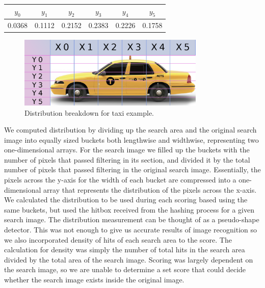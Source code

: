 \documentclass[10pt, journal]{vgtc}                %
\begin{document}
\begin{flushleft}
\begin{table}[h!]
\begin{center}
	\end{center}
	\begin{center}
		\begin{tabular}{cccccc}
			$y_0$ & $y_1$ & $y_2$ & $y_3$ & $y_4$  & $y_5$\\
			\hline
			0.0368 &  0.1112 & 0.2152 & 0.2383 & 0.2226 & 0.1758 \\
		\end{tabular}
\end{center}
\end{table}
\begin{figure}[h!]
\centering
\includegraphics[width=3.5in]{distribution.png}
\caption{Distribution breakdown for taxi example.}
\end{figure}
We computed distribution by dividing up the search area and the original search image into equally sized buckets both lengthwise and widthwise, representing two one-dimensional arrays. For the search image we filled up the buckets with the number of pixels that passed filtering in its section, and divided it by the total number of pixels that passed filtering in the original search image. Essentially, the pixels across the y-axis for the width of each bucket are compressed into a one-dimensional array that represents the distribution of the pixels across the x-axis. We calculated the distribution to be used during each scoring based using the same buckets, but used the hitbox received from the hashing process for a given search image. The distribution measurement can be thought of as a pseudo-shape detector. This was not enough to give us accurate results of image recognition so we also incorporated density of hits of each search area to the score. The calculation for density was simply the number of total hits in the search area divided by the total area of the search image. Scoring was largely dependent on the search image, so we are unable to determine a set score that could decide whether the search image exists inside the original image.

\end{flushleft}
\end{document}
